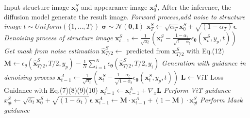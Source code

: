 \begin{algorithm}[H]
  \caption{Fashion Generation} 
  \label{alg}
  \begin{algorithmic}[1]
    \STATE Input structure image $\mathbf{x}_0^S$ and appearance image $\mathbf{x}_0^A$, After the inference, the diffusion model generate the result image.
    \STATE \textit{Forward process,add noise to structure image}
    \STATE $t \sim \textit{Uniform}(\{1, \dotsc, T\})$
    \STATE $\boldsymbol{\sigma} \sim \mathcal{N}(\mathbf{0},\boldsymbol{I})$
    \STATE $\mathbf{x}_T^S \gets\sqrt{\overline{\alpha}_T}\mathbf{x}_0^S + \sqrt{(1 - \overline{\alpha}_T)}\boldsymbol{\epsilon}$
    \STATE \textit{Denoising process of structure image}
    \STATE $\mathbf{x}_{t-1}^S\gets\frac{1}{\sqrt{\alpha_t}}(\mathbf{x}_t^S-\frac{1-\alpha_t}{\sqrt{1-\overline{\alpha}_t}}\epsilon_{\boldsymbol{\theta}}(\mathbf{x}_t^S,y_p,t))$
    \ENDFOR
    \STATE \textit{Get mask from noise estimation}
    \STATE $\hat{\mathbf{x}}^S_{T/2} \gets$ predicted from $\mathbf{x}^S_{T/2}$ with Eq.(12)
    \STATE $\boldsymbol{M}\gets\epsilon_\theta(\hat{\mathbf{x}}^{S}_{T/2},T/2,y_p)-\frac{1}{N} \sum_{i=1}^N\epsilon_{\boldsymbol{\theta}}(\hat{\mathbf{x}}^{S}_{T/2},T/2,y_{i})$
    \STATE \textit{Generation with guidance in denoising process}
      \STATE $\mathbf{x}_{t-1}^A\gets\frac{1}{\sqrt{\alpha_t}}(\mathbf{x}_t^S-\frac{1-\alpha_t}{\sqrt{1-\overline{\alpha}_t}}\epsilon_{\boldsymbol{\theta}}(\mathbf{x}_t^S,y_p,t))$
      \STATE $\boldsymbol{L} \gets $ViT Loss Guidance with Eq.(7)(8)(9)(10)
      \STATE $\mathbf{x}_{t-1}^A\gets\mathbf{x}_{t-1}^A + \nabla_{x}\boldsymbol{L}$
      \STATE \textit{Perform ViT guidance }
      \STATE $x_{qt}^S\gets\sqrt{\overline{\alpha}_t}\mathbf{x}_0^S + \sqrt{(1 - \overline{\alpha}_t)}\boldsymbol{\epsilon}$
      \STATE $\mathbf{x}_{t-1}^A\gets\boldsymbol{M} \cdot  \mathbf{x}^{A}_{t-1} + (1 - \boldsymbol{M})\cdot \mathbf{x}^{S}_{qt}$
      \STATE \textit{Perform Mask guidance }
      \ENDIF
    \ENDFOR

    
  \end{algorithmic}
\end{algorithm}


